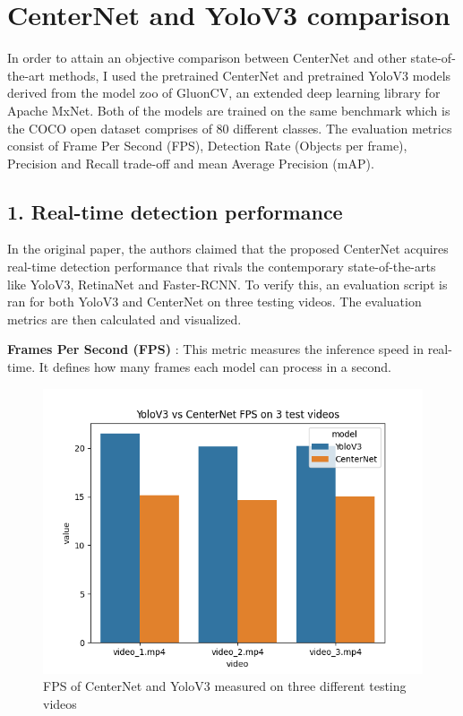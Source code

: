 \documentclass[12pt]{article}
\begin{document}
\section*{CenterNet and YoloV3 comparison}
In order to attain an objective comparison between CenterNet and other state-of-the-art methods, I used the pretrained CenterNet and pretrained YoloV3 models derived from the model zoo of GluonCV, an extended deep learning library for Apache MxNet. Both of the models are trained on the same benchmark which is the COCO open dataset comprises of 80 different classes. The evaluation metrics consist of Frame Per Second (FPS), Detection Rate (Objects per frame), Precision and Recall trade-off and mean Average Precision (mAP).

\subsection*{1. Real-time detection performance}
In the original paper, the authors claimed that the proposed CenterNet acquires real-time detection performance that rivals the contemporary state-of-the-arts like YoloV3, RetinaNet and Faster-RCNN. To verify this, an evaluation script is ran for both YoloV3 and CenterNet on three testing videos. The evaluation metrics are then calculated and visualized.\newline

\textbf{Frames Per Second (FPS)} : This metric measures the inference speed in real-time. It defines how many frames each model can process in a second.
\begin{figure}[H]
    \centering
    \captionsetup{justification=centering}
    \includegraphics[scale=0.8]{images/fps_yolo_vs_centernet.png}
    \caption{FPS of CenterNet and YoloV3 measured on three different testing videos}
\end{figure}
\end{document}
